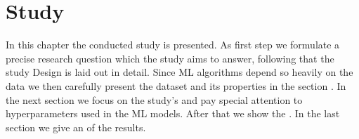 \chapter{Study}
\label{chp:study}

In this chapter the conducted study is presented.
As first step we formulate a precise research question which the study aims to answer, following that the study Design is laid out in detail.
Since \ac{ML} algorithms depend so heavily on the data we then carefully present the dataset and its properties in the section .
In the next section we focus on the study's \textit{} and pay special attention to hyperparameters used in the \ac{ML} models.
After that we show the \textit{}.
In the last section we give an \textit{} of the results.







